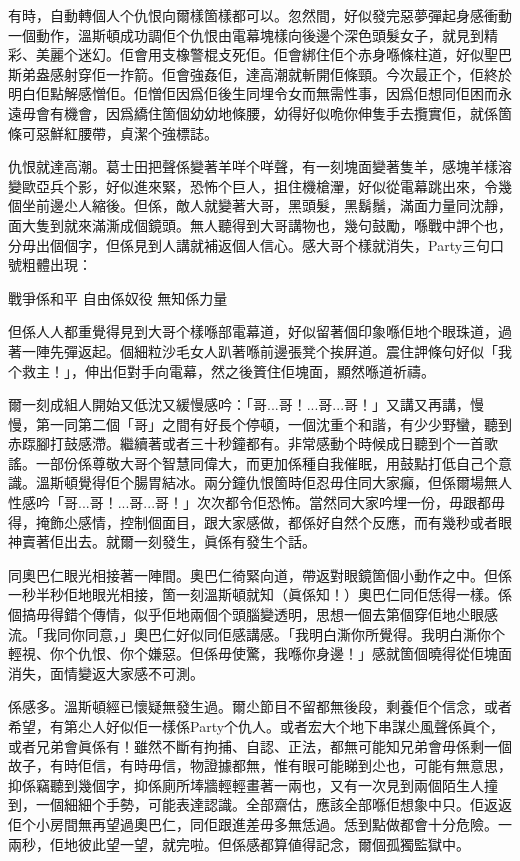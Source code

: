 有時，自動轉個人个仇恨向爾樣箇樣都可以。忽然間，好似發完惡夢彈起身感衝動一個動作，溫斯頓成功調佢个仇恨由電幕塊樣向後邊个深色頭髮女子，就見到精彩、美麗个迷幻。佢會用支橡警棍攴死佢。佢會綁住佢个赤身喺條柱道，好似聖巴斯弟盎感射穿佢一拃箭。佢會強姦佢，達高潮就斬開佢條頸。今次最正个，佢終於明白佢點解感憎佢。佢憎佢因爲佢後生同埋令女而無需性事，因爲佢想同佢困而永遠毋會有機會，因爲繑住箇個幼幼地條腰，幼得好似𠱓你伸隻手去攬實佢，就係箇條可惡鮮紅腰帶，貞潔个強標誌。

仇恨就達高潮。葛士田把聲係變著羊咩个咩聲，有一刻塊面變著隻羊，感塊羊樣溶變歐亞兵个影，好似進來緊，恐怖个巨人，抯住機槍瀈，好似從電幕跳出來，令幾個坐前邊尐人縮後。但係，敵人就變著大哥，黑頭髮，黑鬍鬚，滿面力量同沈靜，面大隻到就來滿澌成個鏡頭。無人聽得到大哥講物也，幾句鼓勵，喺戰中䛅个也，分毋出個個字，但係見到人講就補返個人信心。感大哥个樣就消失，Party三句口號粗體出現：
	
戰爭係和平
自由係奴役
無知係力量

但係人人都重覺得見到大哥个樣喺部電幕道，好似留著個印𧰼喺佢地个眼珠道，過著一陣先彈返起。個細粒沙毛女人趴著喺前邊張凳个挨屛道。震住䛅條句好似「我个救主！」，伸出佢對手向電幕，然之後篢住佢塊面，顯然喺道祈禱。

爾一刻成組人開始又低沈又緩慢感吟：「哥...哥！...哥...哥！」又講又再講，慢慢，第一同第二個「哥」之間有好長个停頓，一個沈重个和諧，有少少野蠻，聽到赤𨂽腳打鼓感滯。繼續著或者三十秒鐘都有。非常感動个時候成日聽到个一首歌謠。一部份係尊敬大哥个智慧同偉大，而更加係種自我催眠，用鼓點打低自己个意識。溫斯頓覺得佢个腸胃結冰。兩分鐘仇恨箇時佢忍毋住同大家癲，但係爾場無人性感吟「哥...哥！...哥...哥！」次次都令佢恐怖。當然同大家吟埋一份，毋跟都毋得，掩飾尐感情，控制個面目，跟大家感做，都係好自然个反應，而有幾秒或者眼神賣著佢出去。就爾一刻發生，眞係有發生个話。

同奧巴仁眼光相接著一陣間。奧巴仁徛緊向道，帶返對眼鏡箇個小動作之中。但係一秒半秒佢地眼光相接，箇一刻溫斯頓就知（眞係知！）奧巴仁同佢恁得一樣。係個搞毋得錯个傳情，似乎佢地兩個个頭腦變透明，思想一個去第個穿佢地尐眼感流。「我同你同意，」奧巴仁好似同佢感講感。「我明白澌你所覺得。我明白澌你个輕視、你个仇恨、你个嫌惡。但係毋使驚，我喺你身邊！」感就箇個曉得從佢塊面消失，面情變返大家感不可測。

係感多。溫斯頓經已懷疑無發生過。爾尐節目不留都無後段，剩養佢个信念，或者希望，有第尐人好似佢一樣係Party个仇人。或者宏大个地下串謀尐風聲係眞个，或者兄弟會眞係有！雖然不斷有拘捕、自認、正法，都無可能知兄弟會毋係剩一個故子，有時佢信，有時毋信，物證據都無，惟有眼可能睇到尐也，可能有無意思，抑係竊聽到幾個字，抑係廁所埲牆輕輕畫著一兩也，又有一次見到兩個陌生人撞到，一個細細个手勢，可能表達認識。全部齋估，應該全部喺佢想𧰼中只。佢返返佢个小房間無再望過奧巴仁，同佢跟進差毋多無恁過。恁到點做都會十分危險。一兩秒，佢地彼此望一望，就完啦。但係感都算値得記念，爾個孤獨監獄中。

